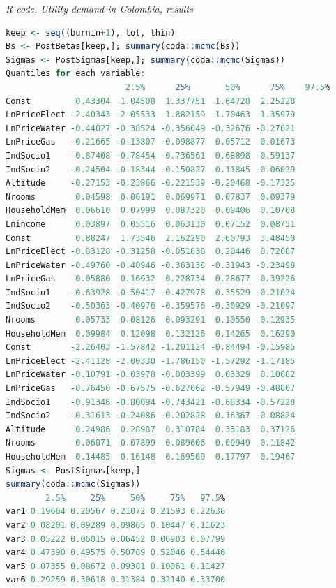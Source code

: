 \begin{enumerate}[leftmargin=*]
\begin{tcolorbox}[enhanced,width=4.67in,center upper,
	fontupper=\large\bfseries,drop shadow southwest,sharp corners]
	\textit{R code. Utility demand in Colombia, results}
	\begin{VF}
		\begin{lstlisting}[language=R]
keep <- seq((burnin+1), tot, thin)
Bs <- PostBetas[keep,]; summary(coda::mcmc(Bs))
Sigmas <- PostSigmas[keep,]; summary(coda::mcmc(Sigmas))
Quantiles for each variable:
						2.5%      25%       50%      75%    97.5%
Const         0.43304  1.04508  1.337751  1.64728  2.25228
LnPriceElect -2.40343 -2.05533 -1.882159 -1.70463 -1.35979
LnPriceWater -0.44027 -0.38524 -0.356049 -0.32676 -0.27021
LnPriceGas   -0.21665 -0.13807 -0.098877 -0.05712  0.01673
IndSocio1    -0.87408 -0.78454 -0.736561 -0.68898 -0.59137
IndSocio2    -0.24504 -0.18344 -0.150827 -0.11845 -0.06029
Altitude     -0.27153 -0.23866 -0.221539 -0.20468 -0.17325
Nrooms        0.04598  0.06191  0.069971  0.07837  0.09379
HouseholdMem  0.06610  0.07999  0.087320  0.09406  0.10708
Lnincome      0.03897  0.05516  0.063130  0.07152  0.08751
Const         0.88247  1.73546  2.162290  2.60793  3.48450
LnPriceElect -0.83128 -0.31258 -0.051838  0.20446  0.72087
LnPriceWater -0.49760 -0.40946 -0.363138 -0.31943 -0.23498
LnPriceGas    0.05880  0.16932  0.228734  0.28677  0.39226
IndSocio1    -0.63928 -0.50417 -0.427978 -0.35529 -0.21024
IndSocio2    -0.50363 -0.40976 -0.359576 -0.30929 -0.21097
Nrooms        0.05733  0.08126  0.093291  0.10550  0.12935
HouseholdMem  0.09984  0.12098  0.132126  0.14265  0.16290
Const        -2.26403 -1.57842 -1.201124 -0.84494 -0.15985
LnPriceElect -2.41128 -2.00330 -1.786150 -1.57292 -1.17185
LnPriceWater -0.10791 -0.03978 -0.003399  0.03329  0.10082
LnPriceGas   -0.76450 -0.67575 -0.627062 -0.57949 -0.48807
IndSocio1    -0.91346 -0.80094 -0.743421 -0.68334 -0.57228
IndSocio2    -0.31613 -0.24086 -0.202828 -0.16367 -0.08824
Altitude      0.24986  0.28987  0.310784  0.33183  0.37126
Nrooms        0.06071  0.07899  0.089606  0.09949  0.11842
HouseholdMem  0.14485  0.16148  0.169509  0.17797  0.19467
Sigmas <- PostSigmas[keep,]
summary(coda::mcmc(Sigmas))
        2.5%     25%     50%     75%   97.5%
var1 0.19664 0.20567 0.21072 0.21593 0.22636
var2 0.08201 0.09289 0.09865 0.10447 0.11623
var3 0.05222 0.06015 0.06452 0.06903 0.07799
var4 0.47390 0.49575 0.50789 0.52046 0.54446
var5 0.07355 0.08672 0.09381 0.10061 0.11427
var6 0.29259 0.30618 0.31384 0.32140 0.33700
\end{lstlisting}
	\end{VF}
\end{tcolorbox} 



\end{enumerate}
